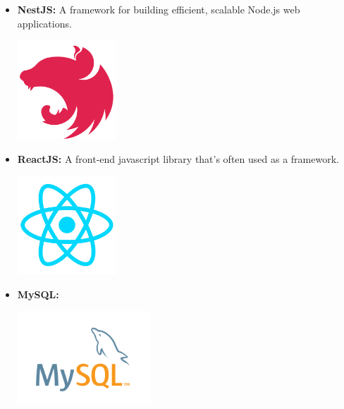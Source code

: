 \begin{itemize}
          \newpage
    \item \textbf{NestJS:} \newline \cite{nestjs} A framework for building efficient, scalable Node.js web applications. \newline
          \begin{minipage}{\linewidth}
              \centering
              \includegraphics[width=3.7cm]{src/assets/logos/nestjs_512x512.png}
          \end{minipage}
    \item \textbf{ReactJS:} \newline A front-end javascript library that's often used as a framework. \newline
          \begin{minipage}{\linewidth}
              \centering
              \includegraphics[width=3.7cm]{src/assets/logos/react_512x512.png}
          \end{minipage}
    \item \textbf{MySQL:} \newline
          \begin{minipage}{\linewidth}
              \centering
              \includegraphics[width=5cm]{src/assets/logos/mysql.png}
          \end{minipage}


\end{itemize}
